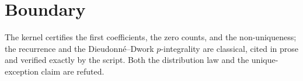 \documentclass[11pt]{article}
\begin{document}
\section{Boundary}

The kernel certifies the first coefficients, the zero counts, and
the non-uniqueness; the recurrence and the Dieudonn\'e--Dwork
$p$-integrality are classical, cited in prose and verified exactly
by the script.  Both the distribution law and the unique-exception
claim are refuted.
\end{document}
